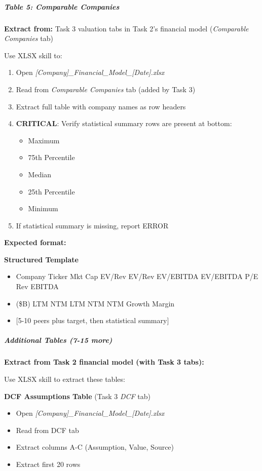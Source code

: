 \documentclass[11pt]{article}
\begin{document}
\subparagraph{Table 5: Comparable Companies}\mbox{}\par
\textbf{Extract from:} Task 3 valuation tabs in Task 2's financial model (\emph{Comparable Companies} tab)


Use XLSX skill to:

\begin{enumerate}[leftmargin=*,itemsep=2pt,topsep=2pt]
\item {} Open \emph{[Company]\_\allowbreak{}Financial\_\allowbreak{}Model\_\allowbreak{}[Date].xlsx}
\item {} Read from \emph{Comparable Companies} tab (added by Task 3)
\item {} Extract full table with company names as row headers
\item {} \textbf{CRITICAL}: Verify statistical summary rows are present at bottom:
\begin{itemize}[leftmargin=*,itemsep=2pt,topsep=2pt]
\item {} Maximum
\item {} 75th Percentile
\item {} Median
\item {} 25th Percentile
\item {} Minimum
\end{itemize}
\item {} If statistical summary is missing, report ERROR
\end{enumerate}

\textbf{Expected format:}

\textbf{Structured Template}
\begin{itemize}[leftmargin=*,itemsep=2pt,topsep=2pt]
\item {} Company Ticker Mkt Cap EV/Rev EV/Rev EV/EBITDA EV/EBITDA P/E Rev EBITDA
\item {} (\$B) LTM NTM LTM NTM NTM Growth Margin
\item {} [5-10 peers plus target, then statistical summary]
\end{itemize}

\subparagraph{Additional Tables (7-15 more)}\mbox{}\par
\textbf{Extract from Task 2 financial model (with Task 3 tabs):}


Use XLSX skill to extract these tables:


\textbf{DCF Assumptions Table} (Task 3 \emph{DCF} tab)

\begin{itemize}[leftmargin=*,itemsep=2pt,topsep=2pt]
\item {} Open \emph{[Company]\_\allowbreak{}Financial\_\allowbreak{}Model\_\allowbreak{}[Date].xlsx}
\item {} Read from DCF tab
\item {} Extract columns A-C (Assumption, Value, Source)
\item {} Extract first 20 rows
\end{itemize}
\end{document}
